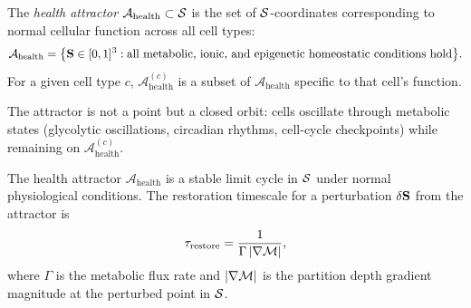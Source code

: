 \begin{definition}
\label{def:health_attractor}
The \emph{health attractor} $\mathcal{A}_{\mathrm{health}} \subset \mathcal{S}$ is the
set of $\mathcal{S}$-coordinates corresponding to normal cellular function across
all cell types:
\begin{equation}
  \mathcal{A}_{\mathrm{health}} = \bigl\{ \mathbf{S} \in [0,1]^3
    : \text{all metabolic, ionic, and epigenetic homeostatic conditions hold} \bigr\}.
  \label{eq:health_attractor_def}
\end{equation}
For a given cell type $c$, $\mathcal{A}_{\mathrm{health}}^{(c)}$ is a
subset of $\mathcal{A}_{\mathrm{health}}$ specific to that cell's function.
\end{definition}

The attractor is not a point but a closed orbit: cells oscillate through
metabolic states (glycolytic oscillations, circadian rhythms, cell-cycle
checkpoints) while remaining on $\mathcal{A}_{\mathrm{health}}^{(c)}$.

\begin{theorem}
\label{thm:attractor_stability}
The health attractor $\mathcal{A}_{\mathrm{health}}$ is a stable limit cycle
in $\mathcal{S}$ under normal physiological conditions.
The restoration timescale for a perturbation $\delta\mathbf{S}$ from the attractor
is
\begin{equation}
  \tau_{\mathrm{restore}} = \frac{1}{\Gamma\,|\nabla\mathcal{M}|},
  \label{eq:restoration_timescale}
\end{equation}
where $\Gamma$ is the metabolic flux rate and $|\nabla\mathcal{M}|$ is the partition
depth gradient magnitude at the perturbed point in $\mathcal{S}$.
\end{theorem}

